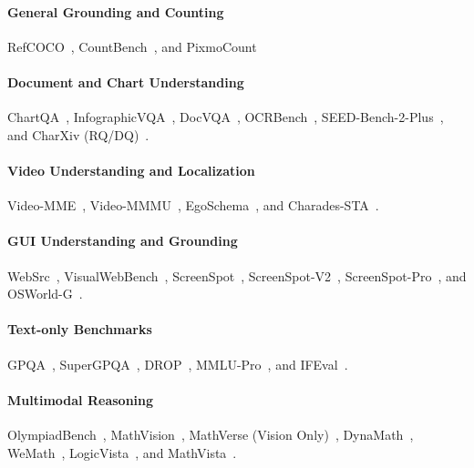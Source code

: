 \paragraph{General Grounding and Counting}
RefCOCO~\citep{refcoco,refcocog,referit}, 
CountBench~\citep{paiss2023teaching}, and
PixmoCount~\citep{deitke2024molmo}

\paragraph{Document and Chart Understanding} 
ChartQA~\citep{masry2022chartqa}, InfographicVQA~\citep{mathew2022infographicvqa}, DocVQA~\citep{mathew2021docvqa}, 
OCRBench~\citep{liu2024ocrbench},
SEED-Bench-2-Plus~\citep{seedbench2plus},
and CharXiv (RQ/DQ)~\citep{wang2024charxiv}.

\paragraph{Video Understanding and Localization}
Video-MME~\citep{fu2024video}, 
Video-MMMU~\citep{hu2025video},
EgoSchema~\citep{mangalam2023egoschema},
and Charades-STA~\cite{charadessta}.



 
\paragraph{GUI Understanding and Grounding}
WebSrc~\citep{chen2021websrc}, VisualWebBench~\citep{liu2024visualwebbench}, ScreenSpot~\citep{cheng2024seeclick}, 
ScreenSpot-V2~\citep{wu2024atlas}, 
ScreenSpot-Pro~\citep{li2025screenspot}, 
and OSWorld-G~\citep{osworldg}.

\paragraph{Text-only Benchmarks}
GPQA~\citep{rein2024gpqa}, SuperGPQA~\citep{du2025supergpqa}, DROP~\citep{dua2019drop}, MMLU-Pro~\citep{wang2024mmlu}, 
and IFEval~\citep{zhou2023instructionfollowingevaluationlargelanguage}.


\paragraph{Multimodal Reasoning} 
OlympiadBench~\citep{he2024olympiadbench}, MathVision~\citep{wang2024measuring}, MathVerse (Vision Only)~\citep{mathverse}, DynaMath~\citep{zou2024dynamath}, WeMath~\citep{qiao2024we}, LogicVista~\citep{xiao2024logicvista}, 
and MathVista~\citep{lu2023mathvista}. 

